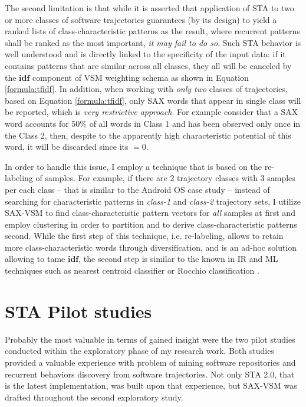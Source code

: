 The second limitation is that while it is asserted that application of STA to two or more classes of software trajectories guarantees (by its design) to yield a ranked lists of class-characteristic patterns as the result, where recurrent patterns shall be ranked as the most important, \textit{it may fail to do so}. Such STA behavior is well understood and is directly linked to the specificity of the input data: if it contains patterns that are similar across all classes, they all will be canceled by the $\textbf{idf}$ component of VSM weighting schema as shown in Equation \eqref{formula:tfidf}. In addition, when working with \textit{only two} classes of trajectories, based on Equation \eqref{formula:tfidf}, only SAX words that appear in single class will be reported, which is \textit{very restrictive approach}. For example consider
that a SAX word accounts for 50\% of all words in Class 1 and has been observed only once in the Class 2, 
then, despite to the apparently high characteristic potential of this word, it will be discarded since its \tfidf$=0$.

In order to handle this issue, I employ a technique that is based on the re-labeling of samples. For example, if there are 2 trajectory classes with 3 samples 
per each class -- that is similar to the Android OS case study -- instead of searching for characteristic patterns in \textit{class-1} and \textit{class-2} trajectory sets,
I utilize SAX-VSM to find class-characteristic pattern vectors for \textit{all} samples at first and employ clustering in order to partition and to derive class-characteristic
patterns second. While the first step of this technique, i.e. re-labeling, allows to retain more class-characteristic words through diversification, and is an ad-hoc solution 
allowing to tame $\textbf{idf}$, the second step is similar to the known in IR and ML techniques such as nearest centroid classifier \cite{classification_centroids} 
or Rocchio classification \cite{salton-71} \cite{intro_ir_Manning}.

\section{STA Pilot studies}
Probably the most valuable in terms of gained insight were the two pilot studies conducted within the exploratory phase of my research 
work. Both studies provided a valuable experience with problem of mining software repositories and recurrent behaviors discovery from 
software trajectories. 
Not only STA 2.0, that is the latest implementation, was built upon that experience, but SAX-VSM was drafted throughout the second 
exploratory study.

